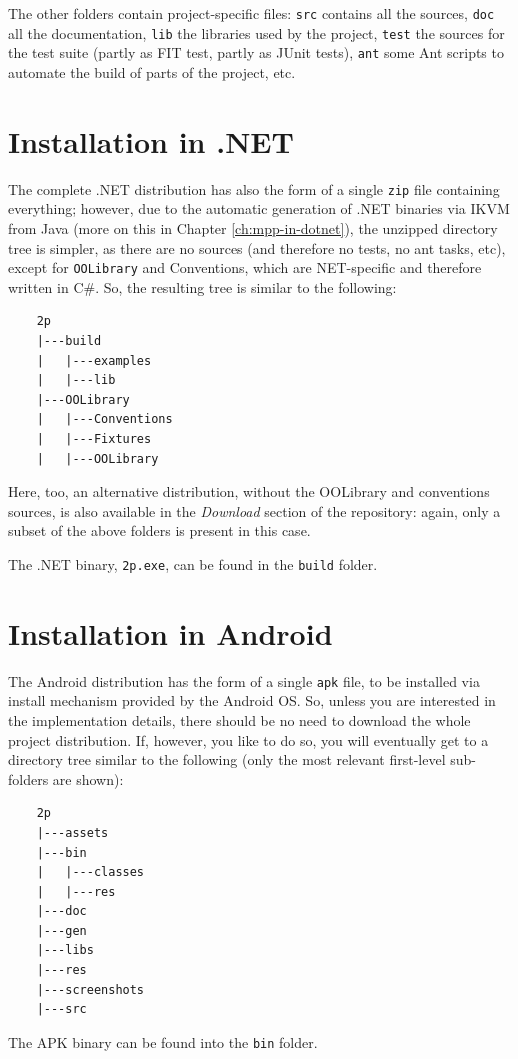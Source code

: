 The other folders contain project-specific files: \texttt{src} contains all the sources, \texttt{doc} all the documentation, \texttt{lib} the libraries used by the \tuprolog{} project, \texttt{test} the sources for the \tuprolog{} test suite (partly as FIT test, partly as JUnit tests), \texttt{ant} some Ant scripts to automate the build of parts of the \tuprolog{} project, etc.


\section{Installation in .NET}

The complete .NET distribution has also the form of a single \texttt{zip} file containing everything; however, due to the automatic generation of \tuprolog{} .NET binaries via IKVM \cite{ikvm} from Java (more on this in Chapter \ref{ch:mpp-in-dotnet}), the unzipped directory tree is simpler, as there are no sources (and therefore no tests, no ant tasks, etc), except for \texttt{OOLibrary} and Conventions, which are NET-specific and therefore written in C\#.
%
So, the resulting tree is similar to the following:
%
\begin{verbatim}
    2p
    |---build
    |   |---examples
    |   |---lib
    |---OOLibrary
    |   |---Conventions
    |   |---Fixtures
    |   |---OOLibrary
\end{verbatim}
%
Here, too, an alternative distribution, without the OOLibrary and conventions sources, is also available in the \textit{Download} section of the \tuprolog{} repository: again, only a subset of the above folders is present in this case.

The .NET binary, \texttt{2p.exe}, can be found in the \texttt{build} folder.


\section{Installation in Android}

The Android distribution has the form of a single \texttt{apk} file, to be installed via install mechanism provided by the Android OS.
So, unless you are interested in the implementation details, there should be no need to download the whole project distribution.
If, however, you like to do so, you will eventually get to a directory tree similar to the following (only the most relevant first-level sub-folders are shown):
%
\begin{verbatim}
    2p
    |---assets
    |---bin
    |   |---classes
    |   |---res
    |---doc
    |---gen
    |---libs
    |---res
    |---screenshots
    |---src
\end{verbatim}
%
The APK binary can be found into the \texttt{bin} folder.

